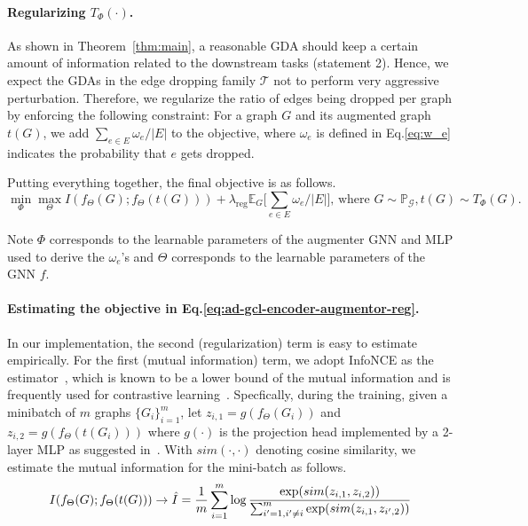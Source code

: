 \paragraph{Regularizing $T_{\Phi}(\cdot)$.} As shown in Theorem~\ref{thm:main}, a reasonable GDA should keep a certain amount of information related to the downstream tasks (statement 2). Hence, we expect the GDAs in the edge dropping family $\mathcal{T}$ not to perform very aggressive perturbation. Therefore, we regularize the ratio of edges being dropped  per graph by enforcing the following constraint: For a graph $G$ and its augmented graph $t(G)$, we add $\sum_{e\in E} \omega_e/|E|$ to the objective, where $\omega_e$ is defined in Eq.\ref{eq:w_e} indicates the probability that $e$ gets dropped. 

Putting everything together, the final objective is as follows.
\begin{equation} \label{eq:ad-gcl-encoder-augmentor-reg}
  \min_{\Phi} \max_{\Theta} I(f_{\Theta}(G) ; f_{\Theta}(t(G))) + \lambda_{\text{reg}} \mathbb{E}_{G}\big[\sum_{e \in E} \omega_e/|E|\big],\, \text{where } G\sim \mathbb{P}_{\mathcal{G}}, t(G)\sim T_{\Phi}(G).
\end{equation}

\vspace{-3mm}
Note $\Phi$ corresponds to the learnable parameters of the augmenter GNN and MLP used to derive the $\omega_{e}$'s and $\Theta$ corresponds to the learnable parameters of the GNN $f$. 
\vspace{-2mm}
\paragraph{Estimating the objective in Eq.\ref{eq:ad-gcl-encoder-augmentor-reg}.} In our implementation, the second (regularization) term is easy to estimate empirically. For the first (mutual information) term, we adopt InfoNCE as the estimator~\cite{oord2018representation, tian2019contrastive, poole2019variational}, which is known to be a lower bound of the mutual information and is frequently used for contrastive learning~\cite{oord2018representation,tschannen2019mutual,chen2020simple}. Specfically, during the training, given a minibatch of $m$ graphs $\{G_i\}_{i=1}^m$, let $z_{i, 1} = g(f_{\Theta}(G_i))$ and $z_{i, 2} = g(f_{\Theta}(t(G_i)))$ where $g(\cdot)$ is the projection head implemented by a 2-layer MLP as suggested in~\cite{chen2020simple}. With $sim(\cdot, \cdot)$ denoting cosine similarity, we estimate the mutual information for the mini-batch as follows.
\begin{equation}
    \label{eq:loss}
    \small{I(f_{\Theta}(G) ; f_{\Theta}(t(G))) \rightarrow \hat{I}= \frac{1}{m}\sum_{i= 1}^{m} \log \frac{\exp(sim(z_{i,1}, z_{i,2}))}{\sum_{i^\prime = 1, i^\prime \neq i }^{m}\exp(sim(z_{i,1}, z_{i^\prime,2}))}}
\end{equation}

